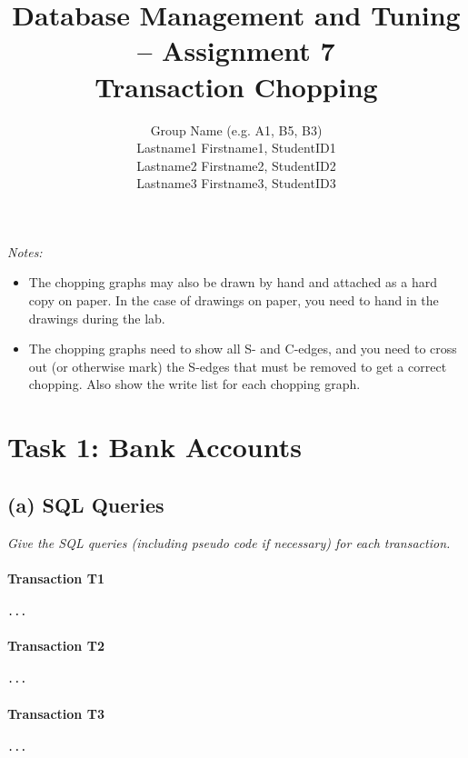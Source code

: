 \documentclass[11pt]{scrartcl}
\title{
  \textbf{\large Database Management and Tuning -- Assignment 7}\\
  Transaction Chopping
}
\author{
 Group Name (e.g. A1, B5, B3)\\
 \large Lastname1 Firstname1, StudentID1 \\
 \large Lastname2 Firstname2, StudentID2 \\
 \large Lastname3 Firstname3, StudentID3
}
\begin{document}
\maketitle

{\it Notes:}

\begin{itemize}
\item The chopping graphs may also be drawn by hand and attached as a
  hard copy on paper. In the case of drawings on paper, you need to
  hand in the drawings during the lab.
\item The chopping graphs need to show all S- and C-edges, and you
  need to cross out (or otherwise mark) the S-edges that must be
  removed to get a correct chopping. Also show the write list for each
  chopping graph.
\end{itemize}

\section*{Task 1:  Bank Accounts}

\subsection*{(a) SQL Queries}

{\it Give the SQL queries (including pseudo code if necessary) for each
transaction.}

\paragraph{Transaction T1}

{\small
\begin{verbatim}
...
\end{verbatim}
}

\paragraph{Transaction T2}

{\small
\begin{verbatim}
...
\end{verbatim}
}

\paragraph{Transaction T3}

{\small
\begin{verbatim}
...
\end{verbatim}
}
\end{document}
